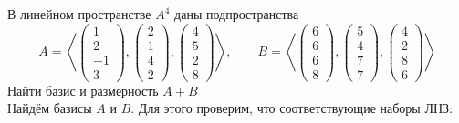 В линейном пространстве $ A^4 $ даны подпространства
$$ A = \left\langle
\begin{pmatrix}
	1 \\
    2 \\
    -1 \\
    3
\end{pmatrix},
\begin{pmatrix}
	2 \\
    1 \\
    4 \\
    2
\end{pmatrix},
\begin{pmatrix}
	4 \\
    5 \\
    2 \\
    8
\end{pmatrix} \right\rangle, \qquad B = \left\langle
\begin{pmatrix}
	6 \\
    6 \\
    6 \\
    8
\end{pmatrix},
\begin{pmatrix}
	5 \\
    4 \\
    7 \\
    7
\end{pmatrix},
\begin{pmatrix}
	4 \\
    2 \\
    8 \\
    6
\end{pmatrix} \right\rangle $$
Найти базис и размерность $ A + B $ \\
Найдём базисы $ A $ и $ B $. Для этого проверим, что соответствующие наборы ЛНЗ:
